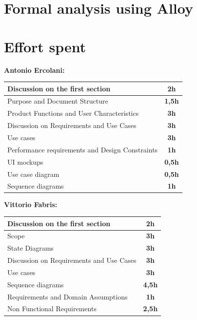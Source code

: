 \documentclass[]{article}
\begin{document}
		
	\section{Formal analysis using Alloy}
	
	\newpage
	
	\section{Effort spent}
	
	\medskip
	\textbf{\large Antonio Ercolani:} \\ \newline
	\begin{tabular}{|l|c|}
		\hline
		Discussion on the first section &  \textbf{2h} \\ \hline
		\rowcolor[HTML]{DCDCDC} 
		Purpose and Document Structure & \textbf{1,5h} \\ \hline
		Product Functions and User Characteristics & \textbf{3h} \\ \hline
		\rowcolor[HTML]{DCDCDC}
		Discussion on Requirements and Use Cases & \textbf{3h} \\ \hline
		Use cases & \textbf{3h} \\ \hline
		\rowcolor[HTML]{DCDCDC}
		Performance requirements and Design Constraints & \textbf{1h} \\ \hline
		UI mockups & \textbf{0,5h} \\ \hline
		\rowcolor[HTML]{DCDCDC}
		Use case diagram & \textbf{0,5h} \\ \hline
		Sequence diagrams & \textbf{1h} \\ \hline
	\end{tabular}
	
	
	\textbf{} \newline
	\textbf{} \newline

	\textbf{\large Vittorio Fabris:} \\ \newline
		\begin{tabular}{|l|c|}
			\hline
			Discussion on the first section &  \textbf{2h} \\ \hline
			\rowcolor[HTML]{DCDCDC} 
			Scope & \textbf{3h} \\ \hline
			State Diagrams & \textbf{3h} \\ \hline
			\rowcolor[HTML]{DCDCDC} 
			Discussion on Requirements and Use Cases & \textbf{3h} \\ \hline
			Use cases & \textbf{3h} \\ \hline
			\rowcolor[HTML]{DCDCDC}
			Sequence diagrams & \textbf{4,5h} \\ \hline
			Requirements and Domain Assumptions  & \textbf{1h} \\ \hline
			\rowcolor[HTML]{DCDCDC}
			Non Functional Requirements & \textbf{2,5h} \\ \hline
		\end{tabular}
		
\end{document}
